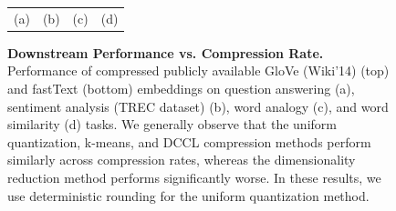 \begin{figure}
\begin{tabular}{@{\hskip -0.0in}c@{\hskip -0.0in}c@{\hskip -0.0in}c@{\hskip -0.0in}c@{\hskip -0.0in}}
		\;\;\;\;\;(a) & \;\;\;\;\;\;(b) & \;\;\;\;\;\;(c) & \;\;\;\;\;\;(d)
	\end{tabular}
	\caption{
		\textbf{Downstream Performance vs. Compression Rate.}
		Performance of compressed publicly available GloVe (Wiki'14) (top) and fastText (bottom) embeddings on question answering (a), sentiment analysis (TREC dataset) (b), word analogy (c), and word similarity (d) tasks.
		We generally observe that the uniform quantization, k-means, and DCCL compression methods perform similarly across compression rates, whereas the dimensionality reduction method performs significantly worse. In these results, we use deterministic rounding for the uniform quantization method.
	}
	\label{fig:perf_comp}
\end{figure}


